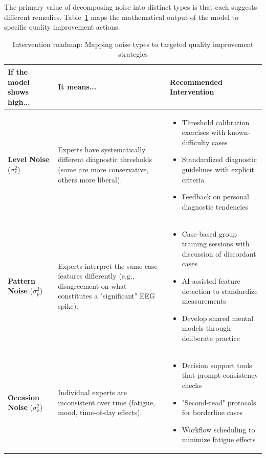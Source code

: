 \documentclass[num-refs]{wiley-article}
\begin{document}
The primary value of decomposing noise into distinct types is that each suggests different remedies. Table~\ref{tab:intervention-roadmap} maps the mathematical output of the model to specific quality improvement actions.

\begin{table}[h]
\centering
\caption{Intervention roadmap: Mapping noise types to targeted quality improvement strategies}
\label{tab:intervention-roadmap}
\begin{tabular}{@{}p{}p{}p{}@{}}
\toprule
\textbf{If the model shows high...} & \textbf{It means...} & \textbf{Recommended Intervention} \\
\midrule
\textbf{Level Noise} ($\sigma_\ell^2$) &
Experts have systematically different diagnostic thresholds (some are more conservative, others more liberal). &
\begin{itemize}[leftmargin=*, nosep]
    \item Threshold calibration exercises with known-difficulty cases
    \item Standardized diagnostic guidelines with explicit criteria
    \item Feedback on personal diagnostic tendencies
\end{itemize} \\
\midrule
\textbf{Pattern Noise} ($\sigma_p^2$) &
Experts interpret the same case features differently (e.g., disagreement on what constitutes a "significant" EEG spike). &
\begin{itemize}[leftmargin=*, nosep]
    \item Case-based group training sessions with discussion of discordant cases
    \item AI-assisted feature detection to standardize measurements
    \item Develop shared mental models through deliberate practice
\end{itemize} \\
\midrule
\textbf{Occasion Noise} ($\sigma_o^2$) &
Individual experts are inconsistent over time (fatigue, mood, time-of-day effects). &
\begin{itemize}[leftmargin=*, nosep]
    \item Decision support tools that prompt consistency checks
    \item "Second-read" protocols for borderline cases
    \item Workflow scheduling to minimize fatigue effects
\end{itemize} \\
\bottomrule
\end{tabular}
\end{table}
\end{document}
